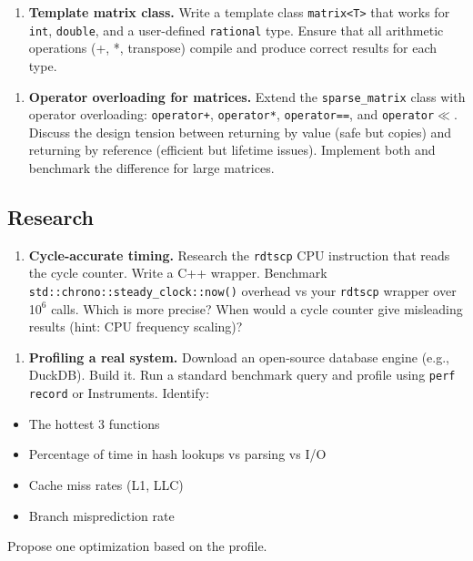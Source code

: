 \begin{enumerate}
\item \textbf{Template matrix class.} Write a template class \texttt{matrix<T>} that works for \texttt{int}, \texttt{double}, and a user-defined \texttt{rational} type. Ensure that all arithmetic operations (+, *, transpose) compile and produce correct results for each type.
\end{enumerate}

\begin{enumerate}
\item \textbf{Operator overloading for matrices.} Extend the \texttt{sparse\_matrix} class with operator overloading: \texttt{operator+}, \texttt{operator*}, \texttt{operator==}, and \texttt{operator$\ll$}. Discuss the design tension between returning by value (safe but copies) and returning by reference (efficient but lifetime issues). Implement both and benchmark the difference for large matrices.
\end{enumerate}

\subsection{Research}

\begin{enumerate}
\item \textbf{Cycle-accurate timing.} Research the \texttt{rdtscp} CPU instruction that reads the cycle counter. Write a C++ wrapper. Benchmark \texttt{std::chrono::steady\_clock::now()} overhead vs your \texttt{rdtscp} wrapper over 1$0^{6}$ calls. Which is more precise? When would a cycle counter give misleading results (hint: CPU frequency scaling)?
\end{enumerate}

\begin{enumerate}
\item \textbf{Profiling a real system.} Download an open-source database engine (e.g., DuckDB). Build it. Run a standard benchmark query and profile using \texttt{perf record} or Instruments. Identify:
\end{enumerate}
\begin{itemize}
\item The hottest 3 functions
\item Percentage of time in hash lookups vs parsing vs I/O
\item Cache miss rates (L1, LLC)
\item Branch misprediction rate
\end{itemize}
    Propose one optimization based on the profile.

